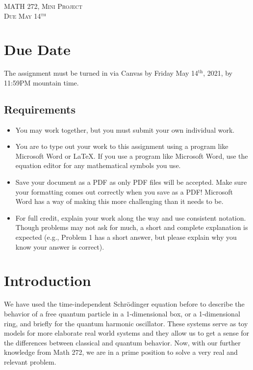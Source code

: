 \documentclass{article}
\begin{document}
\begin{center}
   \LARGE{\textsc{MATH 272, Mini Project}}\\
   \large{\textsc{Due May 14$^\textrm{th}$}}
\end{center}
\vspace{.5cm}


\section*{Due Date}
The assignment must be turned in via Canvas by Friday May 14$^\textrm{th}$, 2021, by 11:59PM mountain time.
\subsection*{Requirements}
\begin{itemize}
    \item You may work together, but you must submit your own individual work.
    \item You are to type out your work to this assignment using a program like Microsoft Word or \LaTeX. If you use a program like Microsoft Word, use the equation editor for any mathematical symbols you use. 
    \item Save your document as a PDF as only PDF files will be accepted. Make sure your formatting comes out correctly when you save as a PDF! Microsoft Word has a way of making this more challenging than it needs to be.
    \item For full credit, explain your work along the way and use consistent notation.  Though problems may not ask for much, a short and complete explanation is expected (e.g., Problem 1 has a short answer, but please explain why you know your answer is correct).
\end{itemize}


\section{Introduction}

We have used the time-independent Schr\"odinger equation before to describe the behavior of a free quantum particle in a 1-dimensional box, or a 1-dimensional ring, and briefly for the quantum harmonic oscillator.  These systems serve as toy models for more elaborate real world systems and they allow us to get a sense for the differences between classical and quantum behavior. Now, with our further knowledge from Math 272, we are in a prime position to solve a very real and relevant problem.
\end{document}
